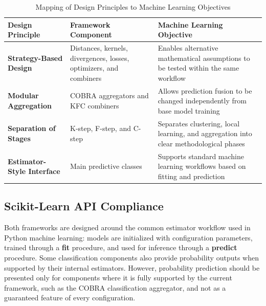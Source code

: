\begin{table}[H]
    \centering
    \caption{Mapping of Design Principles to Machine Learning Objectives}
    \label{tab:pattern_mapping}

    \begin{tabularx}{\textwidth}{l X X}
        \hline
        \textbf{Design Principle}                                          &
        \textbf{Framework Component}                                       &
        \textbf{Machine Learning Objective}                                                    \\
        \hline

        \textbf{Strategy-Based Design}                                     &
        Distances, kernels, divergences, losses, optimizers, and combiners &
        Enables alternative mathematical assumptions to be tested within the same workflow     \\

        \textbf{Modular Aggregation}                                       &
        COBRA aggregators and KFC combiners                                &
        Allows prediction fusion to be changed independently from base model training          \\

        \textbf{Separation of Stages}                                      &
        K-step, F-step, and C-step                                         &
        Separates clustering, local learning, and aggregation into clear methodological phases \\

        \textbf{Estimator-Style Interface}                                 &
        Main predictive classes                                            &
        Supports standard machine learning workflows based on fitting and prediction           \\
        \hline
    \end{tabularx}
\end{table}

\subsection{Scikit-Learn API Compliance}

\hs Both frameworks are designed around the common estimator workflow used in Python machine learning: models are initialized with configuration parameters, trained through a \textbf{fit} procedure, and used for inference through a \textbf{predict} procedure. Some classification components also provide probability outputs when supported by their internal estimators. However, probability prediction should be presented only for components where it is fully supported by the current framework, such as the COBRA classification aggregator, and not as a guaranteed feature of every \KFCProcedure{} configuration.

